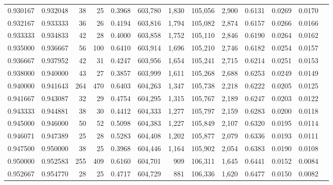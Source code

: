 \begin{tabular}{rrrrrrrrrrrrr}
0.930167 & 0.932048 &    38 &  25 &                                     0.3968 & 603,780 &   1,830 & 105,056 &   2,900 & 0.6131 & 0.0269 & 0.0170 \\
0.932167 & 0.933333 &    36 &  26 &                                     0.4194 & 603,816 &   1,794 & 105,082 &   2,874 & 0.6157 & 0.0266 & 0.0166 \\
0.933333 & 0.934833 &    42 &  28 &                                     0.4000 & 603,858 &   1,752 & 105,110 &   2,846 & 0.6190 & 0.0264 & 0.0162 \\
0.935000 & 0.936667 &    56 & 100 &                                     0.6410 & 603,914 &   1,696 & 105,210 &   2,746 & 0.6182 & 0.0254 & 0.0157 \\
0.936667 & 0.937952 &    42 &  31 &                                     0.4247 & 603,956 &   1,654 & 105,241 &   2,715 & 0.6214 & 0.0251 & 0.0153 \\
0.938000 & 0.940000 &    43 &  27 &                                     0.3857 & 603,999 &   1,611 & 105,268 &   2,688 & 0.6253 & 0.0249 & 0.0149 \\
0.940000 & 0.941643 &   264 & 470 &                                     0.6403 & 604,263 &   1,347 & 105,738 &   2,218 & 0.6222 & 0.0205 & 0.0125 \\
0.941667 & 0.943087 &    32 &  29 &                                     0.4754 & 604,295 &   1,315 & 105,767 &   2,189 & 0.6247 & 0.0203 & 0.0122 \\
0.943333 & 0.944881 &    38 &  30 &                                     0.4412 & 604,333 &   1,277 & 105,797 &   2,159 & 0.6283 & 0.0200 & 0.0118 \\
0.945000 & 0.946000 &    50 &  52 &                                     0.5098 & 604,383 &   1,227 & 105,849 &   2,107 & 0.6320 & 0.0195 & 0.0114 \\
0.946071 & 0.947389 &    25 &  28 &                                     0.5283 & 604,408 &   1,202 & 105,877 &   2,079 & 0.6336 & 0.0193 & 0.0111 \\
0.947500 & 0.950000 &    38 &  25 &                                     0.3968 & 604,446 &   1,164 & 105,902 &   2,054 & 0.6383 & 0.0190 & 0.0108 \\
0.950000 & 0.952583 &   255 & 409 &                                     0.6160 & 604,701 &     909 & 106,311 &   1,645 & 0.6441 & 0.0152 & 0.0084 \\
0.952667 & 0.954770 &    28 &  25 &                                     0.4717 & 604,729 &     881 & 106,336 &   1,620 & 0.6477 & 0.0150 & 0.0082 \\

\end{tabular}
